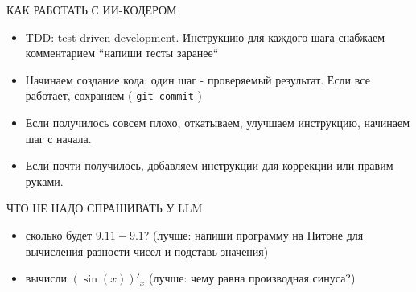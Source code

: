 \documentclass[aspectratio=169]{beamer}
\begin{document}
{ \begin{frame}{КАК РАБОТАТЬ С ИИ-КОДЕРОМ}
	\begin{itemize}		
		\item [-] TDD: test driven development. Инструкцию для каждого шага снабжаем комментарием ``напиши тесты заранее`` 
		\item [-] Начинаем создание кода: один шаг - проверяемый результат. Если все работает, сохраняем ( \texttt{git commit} ) 
		\item [-] Если получилось совсем плохо, откатываем, улучшаем инструкцию, начинаем шаг с начала.
		\item [-] Если почти получилось, добавляем инструкции для коррекции или правим руками.
	\end{itemize}
\end{frame}	


    \begin{frame}{ЧТО НЕ НАДО СПРАШИВАТЬ У LLM}
	\begin{itemize}
		\item [-] сколько будет $9.11 - 9.1$? (лучше: напиши программу на Питоне для вычисления разности чисел и подставь значения)
		\item [-] вычисли $(\sin(x))'_x$ (лучше: чему равна производная синуса?)
				
	\end{itemize}
    \end{frame}	

    } %
    
    
\end{document}
